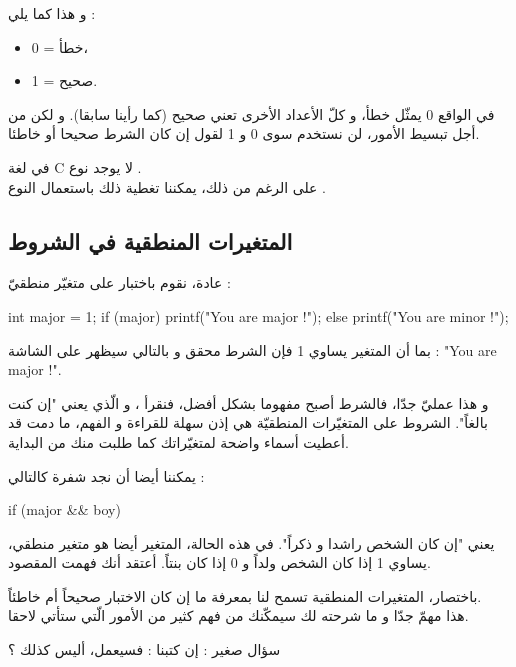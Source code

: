 و هذا كما يلي :

\begin{itemize}
	\item 0 = خطأ،
	\item 1 = صحيح.
\end{itemize}

في الواقع 0 يمثّل خطأ، و كلّ الأعداد الأخرى تعني صحيح (كما رأينا سابقا). و لكن من أجل تبسيط الأمور، لن نستخدم سوى 0 و 1 لقول إن كان الشرط صحيحا أو خاطئا.

في لغة
\textenglish{C}
 لا يوجد نوع
.\\
على الرغم من ذلك، يمكننا تغطية ذلك باستعمال النوع
.

\subsection{المتغيرات المنطقية في الشروط}

عادة، نقوم باختبار
على متغيّر منطقيّ :

\begin{Csource}
int major = 1;
if (major)
{
	printf("You are major !");
}
else {
	printf("You are minor !");
}
\end{Csource}

بما أن المتغير
يساوي 1 فإن الشرط محقق و بالتالي سيظهر على الشاشة :
"\textenglish{You are major !}".

و هذا عمليّ جدّا، فالشرط أصبح مفهوما بشكل أفضل، فنقرأ
،
و الّذي يعني "إن كنت بالغاً". الشروط على المتغيّرات المنطقيّة هي إذن سهلة للقراءة و الفهم، ما دمت قد أعطيت أسماء واضحة لمتغيّراتك كما طلبت منك من البداية.

يمكننا أيضا أن نجد شفرة كالتالي :

\begin{Csource}
if (major && boy)
\end{Csource}

يعني "إن كان الشخص راشدا و ذكراً". في هذه الحالة، المتغير 
أيضا هو متغير منطقي، يساوي 1 إذا كان الشخص ولداً و 0 إذا كان بنتاً. أعتقد أنك فهمت المقصود.

باختصار، المتغيرات المنطقية تسمح لنا بمعرفة ما إن كان الاختبار صحيحاً أم خاطئاً.\\
هذا مهمّ جدّا و ما شرحته لك سيمكّنك من فهم كثير من الأمور الّتي ستأتي لاحقا.

\begin{question}
سؤال صغير : إن كتبنا :
فسيعمل، أليس كذلك ؟
\end{question}


